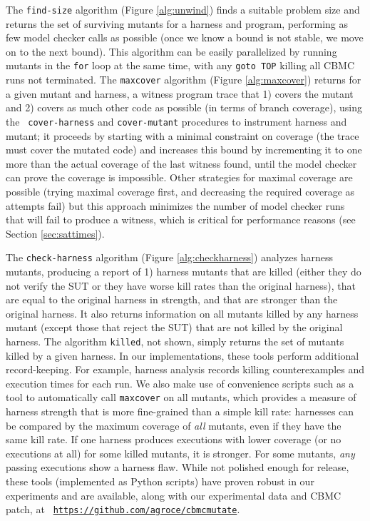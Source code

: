 \documentclass{svjour3}
\begin{document}
The {\tt find-size} algorithm (Figure \ref{alg:unwind}) finds a
suitable problem size and returns the set of surviving mutants for a
harness and program, performing as few model checker calls as possible
(once we know a bound is not stable, we move on to the next bound).
This algorithm can be easily parallelized by running mutants in the
{\tt for} loop at the same time, with any {\tt goto TOP} killing all
CBMC runs not terminated.  The {\tt maxcover} algorithm (Figure
\ref{alg:maxcover}) returns for a given mutant and harness, a witness
program trace that 1) covers the mutant and 2) covers as much other
code as possible (in terms of branch coverage), using the {\tt
  cover-harness} and {\tt cover-mutant} procedures to instrument
harness and mutant; it proceeds by starting with a minimal constraint
on coverage (the trace must cover the mutated code) and increases this
bound by incrementing it to one more than the actual coverage of the
last witness found, until the model checker can prove the coverage is
impossible.  Other strategies for maximal coverage are possible
(trying maximal coverage first, and decreasing the required coverage
as attempts fail) but this approach minimizes the number of model
checker runs that will fail to produce a witness, which is critical
for performance reasons (see Section \ref{sec:sattimes}).

The 
{\tt check-harness} algorithm (Figure \ref{alg:checkharness}) analyzes
harness mutants, producing a report of 1) harness mutants that are
killed (either they do not verify the SUT or they have worse kill
rates than the original harness), that are equal to the original
harness in strength, and that are stronger than the original harness.
It also returns information on all mutants killed by any harness
mutant (except those that reject the SUT) that are not killed by the
original harness.  The algorithm {\tt killed}, not shown, simply
returns the set of mutants killed by a given harness.  In our
implementations, these tools perform additional record-keeping. For
example, harness analysis records killing counterexamples and
execution times for each run.  We also make use of convenience scripts
such as a tool to automatically call {\tt maxcover} on all mutants,
which provides a measure of harness strength that is more fine-grained
than a simple kill rate: harnesses can be compared by the maximum
coverage of \emph{all} mutants, even if they have the same kill rate.
If one harness produces executions with lower coverage (or no
executions at all) for some killed mutants, it is stronger.  For some
mutants, \emph{any} passing executions show a harness flaw. While not
polished enough for release, these tools (implemented as Python
scripts) have proven robust in our experiments and are available,
along with our experimental data and CBMC patch, at {\tt
  \url{https://github.com/agroce/cbmcmutate}}.
\end{document}
